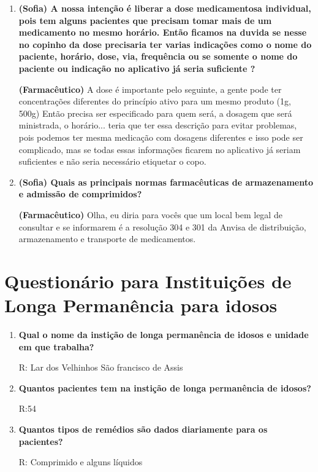 \begin{apendicesenv}
\begin{enumerate}
\item \textbf{(Sofia) A nossa intenção é liberar a dose medicamentosa individual, pois tem alguns pacientes que precisam tomar mais de um medicamento no mesmo horário. Então ficamos na duvida se nesse no copinho da dose precisaria ter varias indicações como o nome do paciente, horário, dose, via, frequência ou se somente o nome do paciente ou indicação no aplicativo já seria suficiente ?}

\textbf{(Farmacêutico)} A dose é importante pelo seguinte, a gente pode ter concentrações diferentes do princípio ativo para um mesmo  produto (1g, 500g) Então precisa ser especificado para quem será, a dosagem que será ministrada, o horário... teria que ter essa descrição para evitar problemas, pois podemos ter mesma medicação com dosagens diferentes e isso pode ser complicado, mas se todas essas informações ficarem no aplicativo já seriam suficientes e não seria necessário etiquetar o copo.

\item \textbf{(Sofia) Quais as principais normas farmacêuticas de armazenamento e admissão de comprimidos?}

\textbf{(Farmacêutico)} Olha, eu diria para vocês que um local bem legal de consultar e se informarem é a resolução 304 e 301 da Anvisa de distribuição, armazenamento e transporte de medicamentos. 
\end{enumerate}

\chapter{Questionário para Instituições de Longa Permanência para idosos}\label{questionario_app}

\begin{enumerate}
    \item \textbf{Qual o nome da instição de longa permanência de idosos e unidade em que trabalha?}
    
    R: Lar dos Velhinhos São francisco de Assis
    
    \item \textbf{Quantos pacientes tem na instição de longa permanência de idosos?}
    
    R:54
    
    \item \textbf{Quantos tipos de remédios são dados diariamente para os pacientes?}
    
    R: Comprimido e alguns líquidos
    

\end{enumerate}
\end{apendicesenv}
